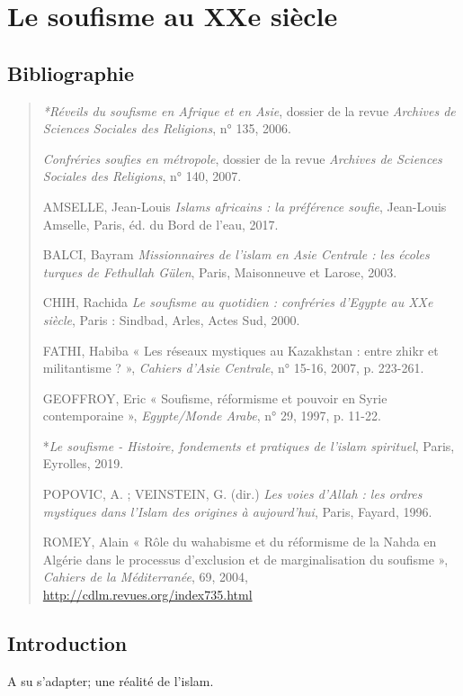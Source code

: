 \chapter{Le soufisme au XXe siècle}

\section{Bibliographie}


\begin{quote}
\emph{*Réveils du soufisme en Afrique et en Asie}, dossier de la revue
\emph{Archives de Sciences Sociales des Religions}, n° 135, 2006.

\emph{Confréries soufies en métropole}, dossier de la revue
\emph{Archives de Sciences Sociales des Religions}, n° 140, 2007.

AMSELLE, Jean-Louis \emph{Islams africains : la préférence soufie},
Jean-Louis Amselle, Paris, éd. du Bord de l'eau, 2017.

BALCI, Bayram \emph{Missionnaires de l'islam en Asie Centrale : les
écoles turques de Fethullah Gülen}, Paris, Maisonneuve et Larose, 2003.

CHIH, Rachida \emph{Le soufisme au quotidien : confréries d'Egypte au
XXe siècle}, Paris : Sindbad, Arles, Actes Sud, 2000.

FATHI, Habiba « Les réseaux mystiques au Kazakhstan : entre zhikr et
militantisme ? », \emph{Cahiers d'Asie Centrale}, n° 15-16, 2007, p.
223-261.

GEOFFROY, Eric « Soufisme, réformisme et pouvoir en Syrie contemporaine
», \emph{Egypte/Monde Arabe}, n° 29, 1997, p. 11-22.

*\emph{Le soufisme - Histoire, fondements et pratiques de l'islam
spirituel}, Paris, Eyrolles, 2019.

POPOVIC, A. ; VEINSTEIN, G. (dir.) \emph{Les voies d'Allah : les ordres
mystiques dans l'Islam des origines à aujourd'hui}, Paris, Fayard, 1996.

ROMEY, Alain « Rôle du wahabisme et du réformisme de la Nahda en Algérie
dans le processus d'exclusion et de marginalisation du soufisme »,
\emph{Cahiers de la Méditerranée}, 69, 2004,
\url{http://cdlm.revues.org/index735.html}
\end{quote}

\section{Introduction}
\begin{Synthesis}
A su s'adapter; une réalité de l'islam.
\end{Synthesis}

